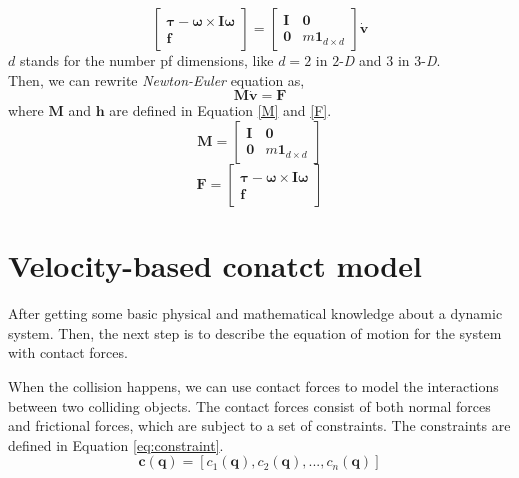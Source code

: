     \begin{equation}
        \left[ \begin{array}{c} \pmb{\tau} - \pmb{\omega} \times \pmb{I} \pmb{\omega}\\ \pmb{f} \end{array}\right] = \left[ \begin{array}{cc} \pmb{I} & \pmb{0} \\ \pmb{0}& m\pmb{1}_{d\times d}\end{array} \right] \dot{\mathbf{v}}
    \end{equation}
    $d$ stands for the number pf dimensions, like $d=2$ in $2$-\textit{D} and $3$ in $3$-\textit{D}. \\

    Then, we can rewrite \textit{Newton-Euler} equation as,
    \begin{equation}
        \pmb{M}\dot{\mathbf{v}} = \mathbf{F}
        \label{eq:newton}
    \end{equation}
    where $\pmb{M}$ and $\mathbf{h}$ are defined in Equation \ref{M} and \ref{F}.
    \begin{equation}
        \pmb{M} = \left[ \begin{array}{cc} \pmb{I} & \pmb{0} \\ \pmb{0} & m\pmb{1}_{d \times d}\end{array} \right]
        \label{M}
    \end{equation}
    \begin{equation}
        \mathbf{F} = \left[ \begin{array}{c} \pmb{\tau} - \pmb{\omega} \times \pmb{I} \pmb{\omega}\\ \pmb{f} \end{array}\right]
        \label{F}
    \end{equation}


\section{Velocity-based conatct model}
    After getting some basic physical and mathematical knowledge about a dynamic system. Then,  the next step is to describe the equation of motion for the system with contact forces. 

    When the collision happens, we can use contact forces to model the interactions between two colliding objects. The contact forces consist of both normal forces and frictional forces, which are subject to a set of constraints. The constraints are defined in Equation \ref{eq:constraint}.
    \begin{equation}
        \pmb{c}(\pmb{q}) = [c_1(\pmb{q}),c_2(\pmb{q}),...,c_n(\pmb{q})]
        \label{eq:constraint}
    \end{equation}

